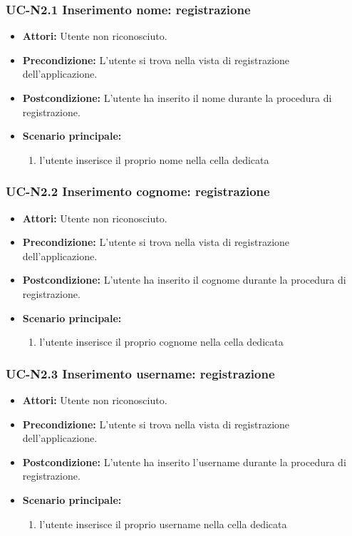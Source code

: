 \subsubsection{UC-N2.1 Inserimento nome: registrazione}
\begin{itemize}
	\item \textbf{Attori: }Utente non riconosciuto.
	\item \textbf{Precondizione: }L'utente si trova nella vista 		di registrazione dell'applicazione.
	\item \textbf{Postcondizione: }L'utente ha inserito il nome durante la procedura di registrazione.
	\item \textbf{Scenario principale: }
	\begin{enumerate}
		\item l'utente inserisce il proprio nome nella cella 				dedicata
	\end{enumerate}
\end{itemize}

\subsubsection{UC-N2.2 Inserimento cognome: registrazione}
\begin{itemize}
	\item \textbf{Attori: }Utente non riconosciuto.
	\item \textbf{Precondizione: }L'utente si trova nella vista 		di registrazione dell'applicazione.
	\item \textbf{Postcondizione: }L'utente ha inserito il cognome durante la procedura di registrazione.
	\item \textbf{Scenario principale: }
	\begin{enumerate}
		\item l'utente inserisce il proprio cognome nella cella 				dedicata
	\end{enumerate}
\end{itemize}

\subsubsection{UC-N2.3 Inserimento username: registrazione}
\begin{itemize}
	\item \textbf{Attori: }Utente non riconosciuto.
	\item \textbf{Precondizione: }L'utente si trova nella vista 		di registrazione dell'applicazione.
	\item \textbf{Postcondizione: }L'utente ha inserito l'username durante la procedura di registrazione.
	\item \textbf{Scenario principale: }
	\begin{enumerate}
		\item l'utente inserisce il proprio username nella cella dedicata
	\end{enumerate}
\end{itemize}


